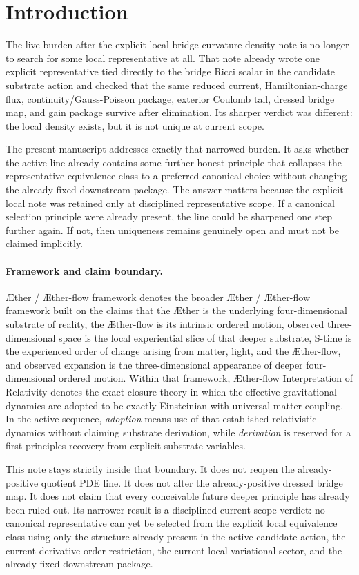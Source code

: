 \documentclass[11pt]{article}
\newcommand{\Aether}{\AE{}ther}
\newcommand{\Aflow}{\AE{}ther-flow}
\newcommand{\TheoryName}{\Aflow{} Interpretation of Relativity}
\newcommand{\TheoryProgram}{\Aether{} / \Aflow{} framework}
\begin{document}
\section{Introduction}

The live burden after the explicit local bridge-curvature-density note is no longer to search for some local representative at all. That note already wrote one explicit representative tied directly to the bridge Ricci scalar in the candidate substrate action and checked that the same reduced current, Hamiltonian-charge flux, continuity/Gauss-Poisson package, exterior Coulomb tail, dressed bridge map, and gain package survive after elimination. Its sharper verdict was different: the local density exists, but it is not unique at current scope.

The present manuscript addresses exactly that narrowed burden. It asks whether the active line already contains some further honest principle that collapses the representative equivalence class to a preferred canonical choice without changing the already-fixed downstream package. The answer matters because the explicit local note was retained only at disciplined representative scope. If a canonical selection principle were already present, the line could be sharpened one step further again. If not, then uniqueness remains genuinely open and must not be claimed implicitly.

\paragraph{Framework and claim boundary.}
\TheoryProgram{} denotes the broader \Aether{} / \Aflow{} framework built on the claims that the \Aether{} is the underlying four-dimensional substrate of reality, the \Aflow{} is its intrinsic ordered motion, observed three-dimensional space is the local experiential slice of that deeper substrate, S-time is the experienced order of change arising from matter, light, and the \Aflow{}, and observed expansion is the three-dimensional appearance of deeper four-dimensional ordered motion. Within that framework, \TheoryName{} denotes the exact-closure theory in which the effective gravitational dynamics are adopted to be exactly Einsteinian with universal matter coupling. In the active sequence, \emph{adoption} means use of that established relativistic dynamics without claiming substrate derivation, while \emph{derivation} is reserved for a first-principles recovery from explicit substrate variables.

This note stays strictly inside that boundary. It does not reopen the already-positive quotient PDE line. It does not alter the already-positive dressed bridge map. It does not claim that every conceivable future deeper principle has already been ruled out. Its narrower result is a disciplined current-scope verdict: no canonical representative can yet be selected from the explicit local equivalence class using only the structure already present in the active candidate action, the current derivative-order restriction, the current local variational sector, and the already-fixed downstream package.
\end{document}
